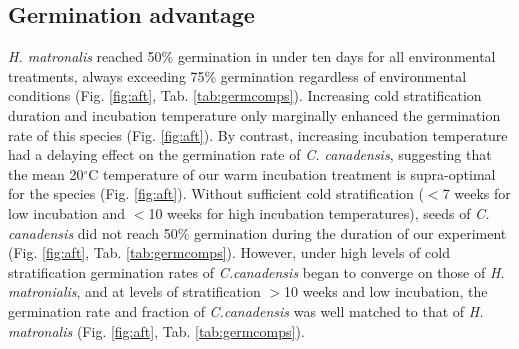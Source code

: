 \documentclass{article}[11pt]
\begin{document}
\subsection*{Germination advantage}
\textit{H. matronalis} reached 50\% germination in under ten days for all environmental treatments, always exceeding 75\% germination regardless of environmental conditions (Fig. \ref{fig:aft}, Tab. \ref{tab:germcomps}). Increasing cold stratification duration and incubation temperature only marginally enhanced the germination rate of this species (Fig. \ref{fig:aft}). By contrast, increasing incubation temperature had a delaying effect on the germination rate of \textit{C. canadensis}, suggesting that the mean 20$^{\circ}$C temperature of our warm incubation treatment is supra-optimal for the species (Fig. \ref{fig:aft}). Without sufficient cold stratification ($<$7 weeks for low incubation and $<$10 weeks for high incubation temperatures), seeds of  \textit{C. canadensis} did not reach 50\% germination during the duration of our experiment (Fig. \ref{fig:aft}, Tab. \ref{tab:germcomps}). However, under high levels of cold stratification germination rates of \textit{C.canadensis} began to converge on those of \textit{H. matronialis}, and at levels of stratification $>$10 weeks and low incubation, the germination rate and fraction of \textit{C.canadensis} was well matched to that of \textit{H. matronalis} (Fig. \ref{fig:aft}, Tab. \ref{tab:germcomps}).
%
\end{document}

